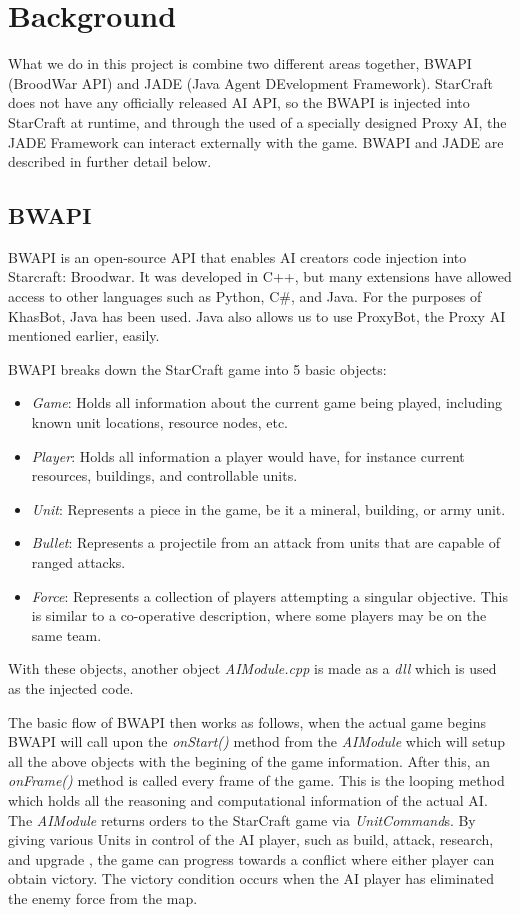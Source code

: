 \documentclass[letterpaper]{article}
\begin{document}
\section{Background}
What we do in this project is combine two different areas together, BWAPI (BroodWar API) and JADE (Java Agent DEvelopment Framework).  StarCraft does not have any officially released AI API, so the BWAPI is injected into StarCraft at runtime, and through the used of a specially designed Proxy AI, the JADE Framework can interact externally with the game.  BWAPI and JADE are described in further detail below.

\subsection{BWAPI}
BWAPI is an open-source API that enables AI creators code injection into Starcraft: Broodwar.  It was developed in C++, but many extensions have allowed access to other languages such as Python, C\#, and Java.  For the purposes of KhasBot, Java has been used.  Java also allows us to use ProxyBot, the Proxy AI mentioned earlier, easily.

BWAPI breaks down the StarCraft game into 5 basic objects: 
\begin{itemize}
\item \emph{Game}:  Holds all information about the current game being played, including known unit locations, resource nodes, etc. 
\item \emph{Player}:  Holds all information a player would have, for instance current resources, buildings, and controllable units.
\item \emph{Unit}: Represents a piece in the game, be it a mineral, building, or army unit.
\item \emph{Bullet}: Represents a projectile from an attack from units that are capable of ranged attacks.
\item \emph{Force}: Represents a collection of players attempting a singular objective.  This is similar to a co-operative description, where some players may be on the same team.
\end{itemize}

With these objects, another object \emph{AIModule.cpp} is made as a \emph{dll} which is used as the injected code.

The basic flow of BWAPI then works as follows, when the actual game begins BWAPI will call upon the \emph{onStart()} method from the \emph{AIModule} which will setup all the above objects with the begining of the game information.  After this, an \emph{onFrame()} method is called every frame of the game.  This is the looping method which holds all the reasoning and computational information of the actual AI.  The \emph{AIModule} returns orders to the StarCraft game via \emph{UnitCommand}s.  By giving various Units in control of the AI player, such as build, attack, research, and upgrade , the game can progress towards a conflict where either player can obtain victory.  The victory condition occurs when the AI player has eliminated the enemy force from the map.
\end{document}
